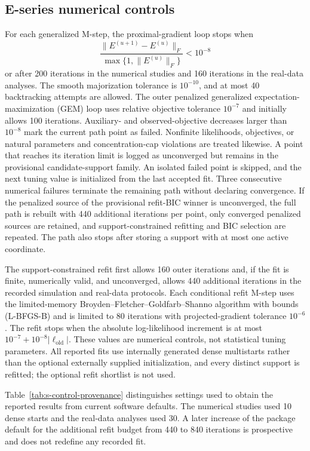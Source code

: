 \documentclass[preprint,12pt,authoryear]{elsarticle}
\begin{document}
\subsection{E-series numerical controls}

For each generalized M-step, the proximal-gradient loop stops when
\[
\frac{\lVert E^{(u+1)}-E^{(u)}\rVert_F}
{\max\{1,\lVert E^{(u)}\rVert_F\}}<10^{-8}
\]
or after 200 iterations in the numerical studies and 160 iterations in the
real-data analyses. The smooth majorization tolerance is $10^{-10}$,
and at most 40 backtracking attempts are allowed. The outer penalized
generalized expectation-maximization (GEM) loop uses relative objective
tolerance $10^{-7}$ and initially allows 100 iterations. Auxiliary- and
observed-objective decreases larger than
$10^{-8}$ mark the current path point as failed. Nonfinite likelihoods,
objectives, or natural parameters and concentration-cap violations are treated
likewise. A point that reaches its iteration limit is logged as unconverged
but remains in the provisional candidate-support family. An isolated failed
point is skipped, and the next tuning value is initialized from the last
accepted fit. Three consecutive numerical failures terminate the remaining
path without declaring convergence. If the penalized source of the provisional
refit-BIC winner is unconverged, the full path is rebuilt with 440 additional
iterations per point, only converged penalized sources are retained, and
support-constrained refitting and BIC selection are repeated. The path
also stops after storing a support with at most one active coordinate.

The support-constrained refit first allows 160 outer iterations and, if the
fit is finite, numerically valid, and unconverged, allows 440 additional
iterations in the recorded simulation and real-data protocols. Each conditional refit M-step uses the
limited-memory Broyden--Fletcher--Goldfarb--Shanno algorithm with bounds
(L-BFGS-B) \citep{byrd1995lbfgsb} and is limited to 80 iterations with
projected-gradient tolerance $10^{-6}$. The refit stops when
the absolute log-likelihood increment is at most
$10^{-7}+10^{-8}|\ell_{\mathrm{old}}|$. These values are numerical controls,
not statistical tuning parameters.
All reported fits use internally generated dense multistarts rather than the
optional externally supplied initialization, and every distinct support is
refitted; the optional refit shortlist is not used.

Table~\ref{tab:s-control-provenance} distinguishes settings used to obtain the
reported results from current software defaults. The numerical studies used
10 dense starts and the real-data analyses used 30. A later increase of the
package default for the additional refit budget from 440 to 840 iterations is
prospective and does not redefine any recorded fit.
\end{document}
